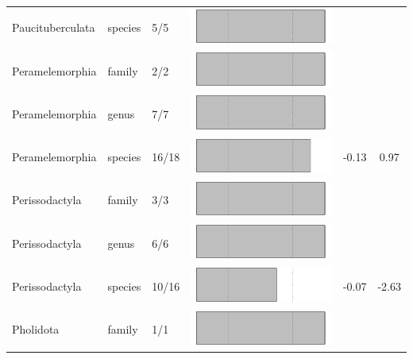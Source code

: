 \begin{longtable}{lL{1.8cm}C{2cm}lcc}
  Paucituberculata & species & 5/5 & \includegraphics[width=0.20\linewidth, height=0.05\linewidth]{Supplementaries/Figures/MissingMammals/Results_1c/Table_figures/bar51.pdf} &   &   \\ 
  Peramelemorphia & family & 2/2 & \includegraphics[width=0.20\linewidth, height=0.05\linewidth]{Supplementaries/Figures/MissingMammals/Results_1c/Table_figures/bar52.pdf} &   &   \\ 
  Peramelemorphia & genus & 7/7 & \includegraphics[width=0.20\linewidth, height=0.05\linewidth]{Supplementaries/Figures/MissingMammals/Results_1c/Table_figures/bar53.pdf} &   &   \\ 
  Peramelemorphia & species & 16/18 & \includegraphics[width=0.20\linewidth, height=0.05\linewidth]{Supplementaries/Figures/MissingMammals/Results_1c/Table_figures/bar54.pdf} & -0.13 & 0.97 \\ 
  Perissodactyla & family & 3/3 & \includegraphics[width=0.20\linewidth, height=0.05\linewidth]{Supplementaries/Figures/MissingMammals/Results_1c/Table_figures/bar55.pdf} &   &   \\ 
  Perissodactyla & genus & 6/6 & \includegraphics[width=0.20\linewidth, height=0.05\linewidth]{Supplementaries/Figures/MissingMammals/Results_1c/Table_figures/bar56.pdf} &   &   \\ 
  Perissodactyla & species & 10/16 & \includegraphics[width=0.20\linewidth, height=0.05\linewidth]{Supplementaries/Figures/MissingMammals/Results_1c/Table_figures/bar57.pdf} & -0.07 & -2.63 \\ 
  Pholidota & family & 1/1 & \includegraphics[width=0.20\linewidth, height=0.05\linewidth]{Supplementaries/Figures/MissingMammals/Results_1c/Table_figures/bar58.pdf} &   &   \\ 

\end{longtable}
